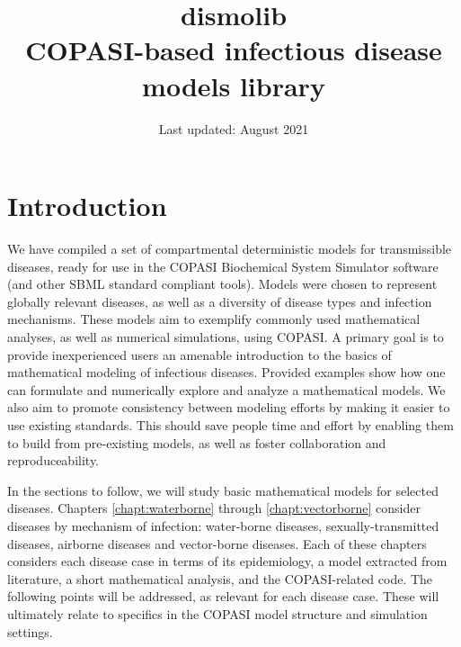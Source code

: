 \documentclass{book}
\title{\textbf{dismolib}\\
COPASI-based infectious disease models library}
\author{}
\date{Last updated: August 2021}
\begin{document}
\maketitle

\tableofcontents

\chapter{Introduction}
\label{chapt:intro}


We have compiled a set of compartmental deterministic models for transmissible diseases, ready for use in the COPASI Biochemical System Simulator software (and other SBML standard compliant tools). Models were chosen to represent globally relevant diseases, as well as a diversity of disease types and infection mechanisms. These models aim to exemplify commonly used mathematical analyses, as well as numerical simulations, using COPASI. A primary goal is to provide inexperienced users an amenable introduction to the basics of mathematical modeling of infectious diseases. Provided examples show how one can formulate and numerically explore and analyze a mathematical models. We also aim to promote consistency between modeling efforts by making it easier to use existing standards. This should save people time and effort by enabling them to build from pre-existing models, as well as foster collaboration and reproduceability.

In the sections to follow, we will study basic mathematical models for selected diseases. Chapters \ref{chapt:waterborne} through \ref{chapt:vectorborne} consider diseases by mechanism of infection: water-borne diseases, sexually-transmitted diseases, airborne diseases and vector-borne diseases. Each of these chapters considers each disease case in terms of its epidemiology, a model extracted from literature, a short mathematical analysis, and the COPASI-related code. The following points will be addressed, as relevant for each disease case. These will ultimately relate to specifics in the COPASI model structure and simulation settings.
\end{document}
